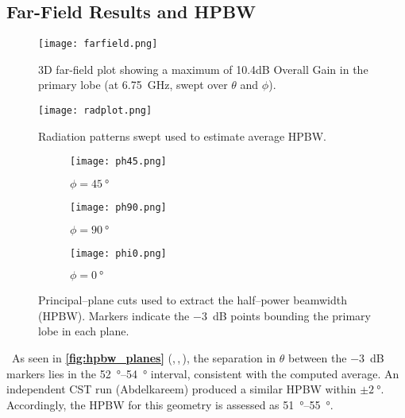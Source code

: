 \documentclass[11pt]{article}
\let\oldautoref\autoref
\renewcommand{\autoref}[1]{\textbf{\oldautoref{#1}}}
\begin{document}
\subsection{Far-Field Results and HPBW}
\begin{figure}[H]
  \centering
  \texttt{[image: farfield.png]}
  \caption{3D far-field plot showing a maximum of 10.4dB Overall Gain in the primary lobe (at \SI{6.75}{GHz}, swept over $\theta$ and $\phi$).}
  \label{fig:farfield3d}
\end{figure}

\begin{figure}[H]
  \centering
  \texttt{[image: radplot.png]}
  \caption{Radiation patterns swept used to estimate average HPBW.}
  \label{fig:radplot}
\end{figure}

\begin{figure}[H]
  \centering

  \begin{subfigure}[b]{0.48\textwidth}
    \centering
    \texttt{[image: ph45.png]}
    \caption{$\phi=\SI{45}{\degree}$}
    \label{fig:phi45}
  \end{subfigure}\hfill
  \begin{subfigure}[b]{0.48\textwidth}
    \centering
    \texttt{[image: ph90.png]}
    \caption{$\phi=\SI{90}{\degree}$}
    \label{fig:phi90}
  \end{subfigure}

  \vspace{0.6em}

  \begin{subfigure}[b]{0.98\textwidth}
    \centering
    \texttt{[image: phi0.png]}
    \caption{$\phi=\SI{0}{\degree}$}
    \label{fig:phi0}
  \end{subfigure}

  \caption{Principal–plane cuts used to extract the half–power beamwidth (HPBW). Markers indicate the \SI{-3}{dB} points bounding the primary lobe in each plane.}
  \label{fig:hpbw_planes}
\end{figure}

\textbullet\ As seen in \autoref{fig:hpbw_planes} (\textbf{},\,\textbf{},\,\textbf{}), the separation in $\theta$ between the \SI{-3}{dB} markers lies in the \SIrange{52}{54}{\degree} interval, consistent with the computed average. An independent CST run (Abdelkareem) produced a similar HPBW within $\pm\SI{2}{\degree}$. Accordingly, the HPBW for this geometry is assessed as \SIrange{51}{55}{\degree}.
\end{document}
